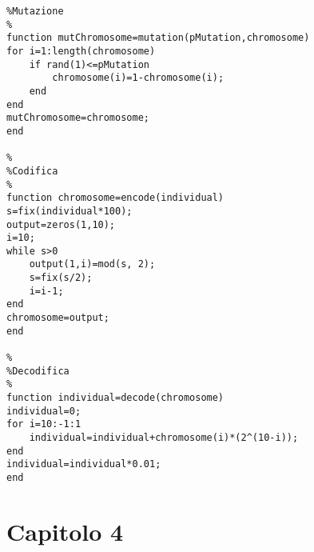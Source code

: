 \begin{lstlisting}[style=matlab, style=matlab2, style=matlab3]
%
%Mutazione
%
function mutChromosome=mutation(pMutation,chromosome)
for i=1:length(chromosome)
    if rand(1)<=pMutation
        chromosome(i)=1-chromosome(i);
    end
end
mutChromosome=chromosome;
end

%
%Codifica
%
function chromosome=encode(individual)
s=fix(individual*100);
output=zeros(1,10);
i=10;
while s>0
    output(1,i)=mod(s, 2);
    s=fix(s/2);
    i=i-1;
end
chromosome=output;
end

%
%Decodifica
%
function individual=decode(chromosome)
individual=0;
for i=10:-1:1
    individual=individual+chromosome(i)*(2^(10-i));
end
individual=individual*0.01;
end
\end{lstlisting}
\section{Capitolo 4}
